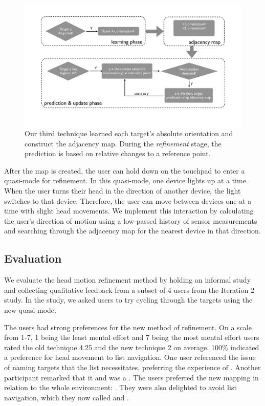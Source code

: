\begin{figure}[t]
\centering
\includegraphics[width=1\columnwidth]{figures/third_technique.pdf}
\caption{Our third technique learned each target's absolute orientation and
construct the adjacency map. During the {\em refinement} stage, the prediction
is based on relative changes to a reference point.}
\label{fig:third_technique}
\end{figure}

After the map is created, the user can hold down on the touchpad to enter a
quasi-mode for refinement. In this quasi-mode, one device lights up at a time.
When the user turns their head in the direction of another device, the light
switches to that device. Therefore, the user can move between devices one at a
time with slight head movements. We implement this interaction by calculating
the user's direction of motion using a low-passed history of sensor
measurements and searching through the adjacency map for the nearest device in
that direction.

\subsection{Evaluation}
We evaluate the head motion refinement method by holding an informal study and
collecting qualitative feedback from a subset of 4 users from the Iteration 2
study. In the study, we asked users to try cycling through the targets using
the new quasi-mode.

The users had strong preferences for the new method of refinement. On a scale
from 1-7, 1 being the least mental effort and 7 being the most mental effort
users rated the old technique 4.25 and the new technique 2 on average. 100\%
indicated a preference for head movement to list navigation. One user
referenced the issue of naming targets that the list necessitates, preferring
the experience of .
Another participant remarked that it  and was
a . The users
preferred the new mapping in relation to the whole environment: . They
were also delighted to avoid list navigation, which they now called
 and .
